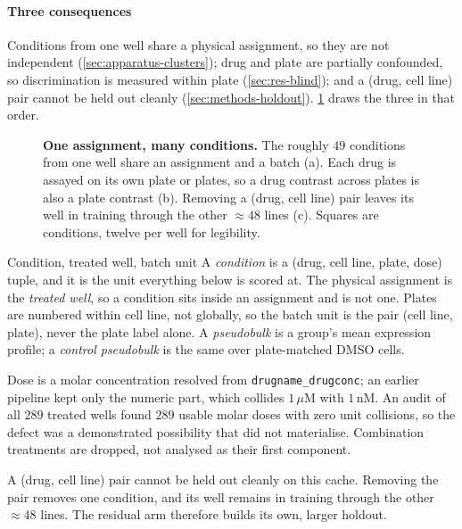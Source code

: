 \paragraph{Three consequences} Conditions from one well share a physical
assignment, so they are not independent (\cref{sec:apparatus-clusters}); drug
and plate are partially confounded, so discrimination is measured within plate
(\cref{sec:res-blind}); and a (drug, cell line) pair cannot be held out cleanly
(\cref{sec:methods-holdout}). \cref{fig:confound} draws the three in that
order.

\begin{figure}[htbp]
\centering

\caption[The well is the unit the atlas actually assigns]{\textbf{One
assignment, many conditions.} The roughly $49$ conditions from one well share
an assignment and a batch (a). Each drug is assayed on its own plate or plates,
so a drug contrast across plates is also a plate contrast (b). Removing a (drug,
cell line) pair leaves its well in training through the other $\approx 48$ lines
(c). Squares are conditions, twelve per well for legibility.}
\label{fig:confound}
\end{figure}

\begin{defn}{Condition, treated well, batch unit}
A \emph{condition} is a (drug, cell line, plate, dose) tuple, and it is the unit
everything below is scored at. The physical assignment is the \emph{treated
well}, so a condition sits inside an assignment and is not one. Plates are
numbered within cell line, not globally, so the batch unit is the pair (cell
line, plate), never the plate label alone. A \emph{pseudobulk} is a group's mean
expression profile; a \emph{control pseudobulk} is the same over plate-matched
DMSO cells.
\end{defn}

Dose is a molar concentration resolved from \texttt{drugname\_drugconc}; an
earlier pipeline kept only the numeric part, which collides $1\,\mu$M with
$1\,$nM. An audit of all $289$ treated wells found $289$ usable molar doses
with zero unit collisions, so the defect was a demonstrated possibility that did
not materialise. Combination treatments are dropped, not analysed as their first
component.

\begin{scopelimit}
A (drug, cell line) pair cannot be held out cleanly on this cache. Removing the
pair removes one condition, and its well remains in training through the other
$\approx 48$ lines. The residual arm therefore builds its own, larger holdout.
\end{scopelimit}

